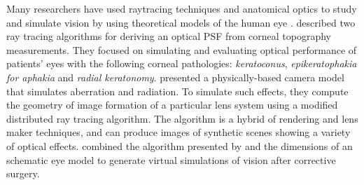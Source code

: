 Many researchers have used raytracing techniques and anatomical optics to study and simulate vision by using theoretical models of the human eye \cite{Camp1990, Kolb1995}. \citet{Camp1990} described two ray tracing algorithms for deriving an optical PSF from corneal topography measurements. They focused on simulating and evaluating optical performance of patients' eyes with the following corneal pathologies: \emph{keratoconus}, \emph{epikeratophakia for aphakia} and \emph{radial keratonomy}. \citet{Kolb1995} presented a physically-based camera model that simulates aberration and radiation. To simulate such effects, they compute the geometry of image formation of a particular lens system using a modified distributed ray tracing algorithm. The algorithm is a hybrid of rendering and lens maker techniques, and can produce images of synthetic scenes showing a variety of optical effects. \citet{Mostafawy1997} combined the algorithm presented by \citet{Kolb1995} and the dimensions of an schematic eye model to generate virtual simulations of vision after corrective surgery.

